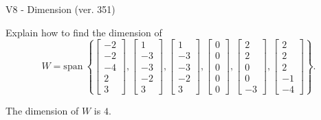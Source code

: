 \begin{exercise}
  \begin{exerciseTitle}V8 - Dimension (ver. 351)\end{exerciseTitle}
  \begin{exerciseStatement}
    Explain how to find the dimension of 
\[W=\mathrm{span}\ \left\{\left[\begin{array}{r}
-2 \\
-2 \\
-4 \\
2 \\
3
\end{array}\right] , \left[\begin{array}{r}
1 \\
-3 \\
-3 \\
-2 \\
3
\end{array}\right] , \left[\begin{array}{r}
1 \\
-3 \\
-3 \\
-2 \\
3
\end{array}\right] , \left[\begin{array}{r}
0 \\
0 \\
0 \\
0 \\
0
\end{array}\right] , \left[\begin{array}{r}
2 \\
2 \\
0 \\
0 \\
-3
\end{array}\right] , \left[\begin{array}{r}
2 \\
2 \\
2 \\
-1 \\
-4
\end{array}\right]\right\}.\]



  \end{exerciseStatement}
  \begin{exerciseAnswer}
   The dimension of \(W\) is  \(4\).
  


  \end{exerciseAnswer}
\end{exercise}